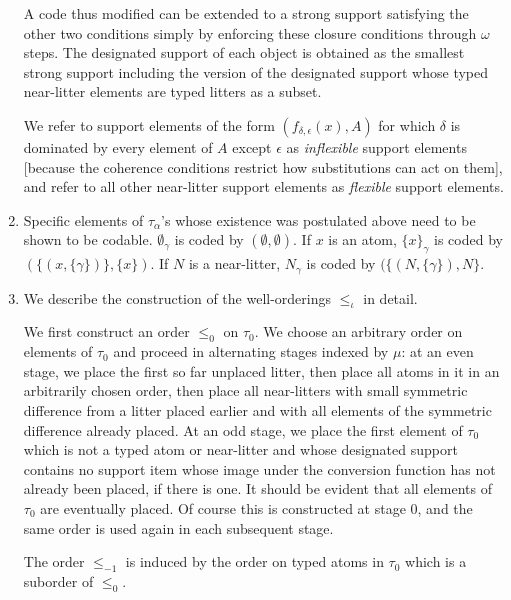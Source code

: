\documentclass[12pt]{article}
\begin{document}
\begin{enumerate}
A code thus modified can be extended to a strong support satisfying the other two conditions simply by enforcing these closure conditions through $\omega$ steps.  The designated support  of each object is obtained as the  smallest strong support including the version of the designated support whose typed near-litter elements are typed litters  as a subset.

We refer to support elements of the form $(f_{\delta,\epsilon}(x),A)$ for which $\delta$ is dominated by every element of $A$ except $\epsilon$ as {\em inflexible\/} support elements [because the coherence conditions restrict how substitutions can act on them], and refer to all other near-litter support elements as {\em flexible\/} support elements.

\item Specific elements of $\tau_\alpha$'s whose existence was postulated above need to be shown to be codable.  $\emptyset_\gamma$ is coded by $(\emptyset,\emptyset)$.  If $x$ is an atom, $\{x\}_\gamma$ is coded by $(\{(x,\{\gamma\})\},\{x\})$.  If $N$ is a near-litter,
$N_\gamma$ is coded by $(\{(N,\{\gamma\}),N\}$.

\item  We describe the construction of the well-orderings $\leq_\iota$ in detail.

We first construct an order $\leq_0$  on $\tau_0$.  We choose an arbitrary order on elements of $\tau_0$ and proceed in alternating stages indexed by $\mu$:  at an even stage, we place the first so far unplaced litter, then place all atoms in it in an arbitrarily chosen order, then place all near-litters with small symmetric difference from a litter placed earlier and with all elements of the symmetric difference already placed.  At an odd stage, we place the first element of $\tau_0$ which is not a typed atom or near-litter and whose designated support contains no support item whose image under the conversion function has not already been placed, if there is one.  It should be evident that all elements of $\tau_0$ are eventually placed.  Of course this is constructed
at stage 0, and the same order is used again in each subsequent stage.

The order $\leq_{-1}$
is induced by the order on typed atoms in $\tau_0$ which is a suborder of $\leq_0$.




\end{enumerate}
\end{document}

